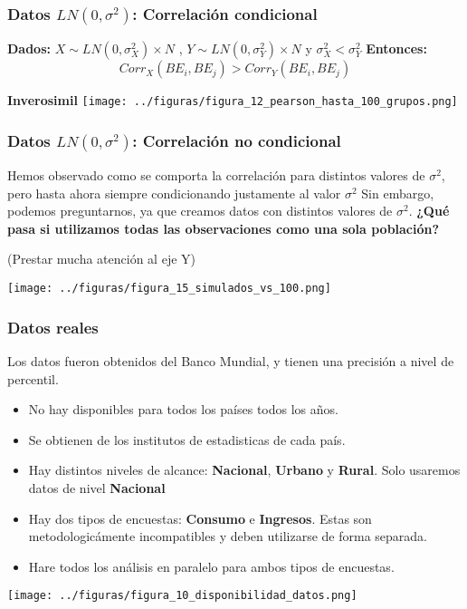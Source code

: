 \documentclass[10pt,mathserif]{beamer}%
\begin{document}
\begin{frame}
    \frametitle{Datos $LN(0, \sigma^2)$: Correlación condicional}
    \begin{conjeture}
    \textbf{Dados: } $X \sim LN(0,\sigma_X^2) \times N$ , $Y \sim LN(0,\sigma_Y^2) \times N$ y $\sigma_X^2 < \sigma_Y^2$
    \textbf{Entonces:} $$ Corr_X(BE_i,BE_j) > Corr_Y(BE_i,BE_j)$$
    \end{conjeture}
    \pause
    \textbf{Inverosimil}
    \texttt{[image: ../figuras/figura\_12\_pearson\_hasta\_100\_grupos.png]} %
\end{frame}

\begin{frame}
    \frametitle{Datos $LN(0, \sigma^2)$: Correlación no condicional}
    Hemos observado como se comporta la correlación para distintos valores de $\sigma^2$, pero hasta ahora siempre condicionando justamente al valor $\sigma^2$
    Sin embargo, podemos preguntarnos, ya que creamos datos con distintos valores de $\sigma^2$.
    \textbf{¿Qué pasa si utilizamos todas las observaciones como una sola población?}
    \pause

    (Prestar mucha atención al eje Y)
    
    \texttt{[image: ../figuras/figura\_15\_simulados\_vs\_100.png]} %

\end{frame}

\begin{frame}
    \frametitle{Datos reales}
    Los datos fueron obtenidos del Banco Mundial, y tienen una precisión a nivel de percentil.
    \begin{itemize}
        \item No hay disponibles para todos los países todos los años.
        \item Se obtienen de los institutos de estadisticas de cada país.
        \item Hay distintos niveles de alcance: \textbf{Nacional}, \textbf{Urbano} y \textbf{Rural}. Solo usaremos datos de nivel \textbf{Nacional}
        \item Hay dos tipos de encuestas: \textbf{Consumo} e \textbf{Ingresos}. Estas son metodologicámente incompatibles y deben utilizarse de forma separada.
        \item Hare todos los análisis en paralelo para ambos tipos de encuestas. 
    \end{itemize}
    \texttt{[image: ../figuras/figura\_10\_disponibilidad\_datos.png]} %
\end{frame}
\end{document}

